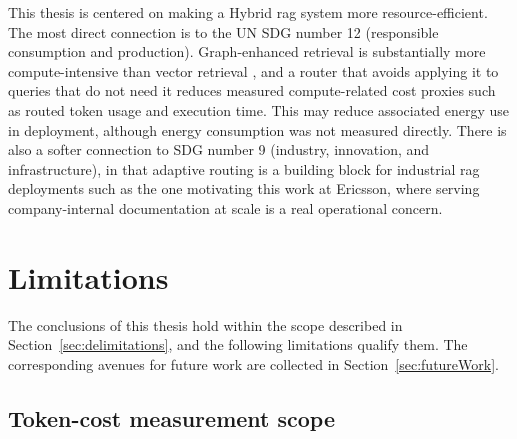 \documentclass[english, bibtex]{kththesis}               %
\numberwithin{listing}{chapter}
\providecommand{\DIFaddtex}[1]{{\protect\color{blue} \sf #1}} %
\providecommand{\DIFadd}[1]{\texorpdfstring{\DIFaddtex{#1}}{#1}} %
\begin{document}
\DIFadd{This thesis is centered on making a Hybrid \gls{rag} system more resource-efficient. The most direct connection is to the \gls{UN} \gls{SDG} number 12 (responsible consumption and production). Graph-enhanced retrieval is substantially more compute-intensive than vector retrieval \cite{lightrag2024,microsoft2024graphragcosts}, and a router that avoids applying it to queries that do not need it reduces measured compute-related cost proxies such as routed token usage and execution time. This may reduce associated energy use in deployment, although energy consumption was not measured directly. There is also a softer connection to \gls{SDG} number 9 (industry, innovation, and infrastructure), in that adaptive routing is a building block for industrial \gls{rag} deployments such as the one motivating this work at Ericsson, where serving company-internal documentation at scale is a real operational concern.
}

\section{Limitations}
\label{sec:discLimitations}
\label{sec:limitationsFutureWork}

\DIFadd{The conclusions of this thesis hold within the scope described in Section~\ref{sec:delimitations}, and the following limitations qualify them. The corresponding avenues for future work are collected in Section~\ref{sec:futureWork}.
}

\subsection{Token-cost measurement scope}
\label{sec:limitTokenCost}
\end{document}
